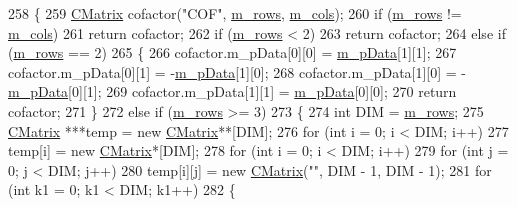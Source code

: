 \begin{DoxyCode}
258         \{
259             \hyperlink{classCMatrix}{CMatrix} cofactor(\textcolor{stringliteral}{"COF"}, \hyperlink{classCMatrix_ae23e5f8016ba06cfd1cce364a99f5037}{m\_rows}, \hyperlink{classCMatrix_a723f752208c055093012984eaddb62d3}{m\_cols});
260             \textcolor{keywordflow}{if} (\hyperlink{classCMatrix_ae23e5f8016ba06cfd1cce364a99f5037}{m\_rows} != \hyperlink{classCMatrix_a723f752208c055093012984eaddb62d3}{m\_cols})
261                 \textcolor{keywordflow}{return} cofactor;
262             \textcolor{keywordflow}{if} (\hyperlink{classCMatrix_ae23e5f8016ba06cfd1cce364a99f5037}{m\_rows} < 2)
263                 \textcolor{keywordflow}{return} cofactor;
264             \textcolor{keywordflow}{else} \textcolor{keywordflow}{if} (\hyperlink{classCMatrix_ae23e5f8016ba06cfd1cce364a99f5037}{m\_rows} == 2)
265             \{
266                 cofactor.m\_pData[0][0] = \hyperlink{classCMatrix_ab0f18d68cad9b6d750d05a96b60a759d}{m\_pData}[1][1];
267                 cofactor.m\_pData[0][1] = -\hyperlink{classCMatrix_ab0f18d68cad9b6d750d05a96b60a759d}{m\_pData}[1][0];
268                 cofactor.m\_pData[1][0] = -\hyperlink{classCMatrix_ab0f18d68cad9b6d750d05a96b60a759d}{m\_pData}[0][1];
269                 cofactor.m\_pData[1][1] = \hyperlink{classCMatrix_ab0f18d68cad9b6d750d05a96b60a759d}{m\_pData}[0][0];
270                 \textcolor{keywordflow}{return} cofactor;
271             \}
272             \textcolor{keywordflow}{else} \textcolor{keywordflow}{if} (\hyperlink{classCMatrix_ae23e5f8016ba06cfd1cce364a99f5037}{m\_rows} >= 3)
273             \{
274                 \textcolor{keywordtype}{int} DIM = \hyperlink{classCMatrix_ae23e5f8016ba06cfd1cce364a99f5037}{m\_rows};
275                 \hyperlink{classCMatrix}{CMatrix} ***temp = \textcolor{keyword}{new} \hyperlink{classCMatrix}{CMatrix}**[DIM];
276                 \textcolor{keywordflow}{for} (\textcolor{keywordtype}{int} i = 0; i < DIM; i++)
277                     temp[i] = \textcolor{keyword}{new} \hyperlink{classCMatrix}{CMatrix}*[DIM];
278                 \textcolor{keywordflow}{for} (\textcolor{keywordtype}{int} i = 0; i < DIM; i++)
279                     \textcolor{keywordflow}{for} (\textcolor{keywordtype}{int} j = 0; j < DIM; j++)
280                         temp[i][j] = \textcolor{keyword}{new} \hyperlink{classCMatrix_a720aa6a48296f4414ac7f9021bc420c4}{CMatrix}(\textcolor{stringliteral}{""}, DIM - 1, DIM - 1);
281                 \textcolor{keywordflow}{for} (\textcolor{keywordtype}{int} k1 = 0; k1 < DIM; k1++)
282                 \{

\end{DoxyCode}
